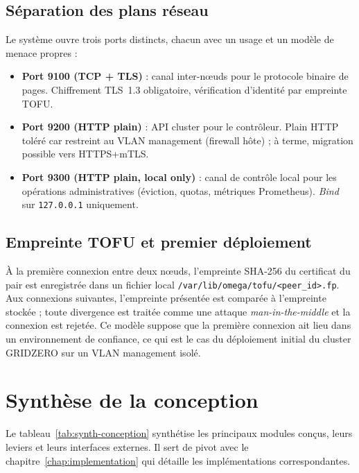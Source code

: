 \subsection{Séparation des plans réseau}

Le système ouvre trois ports distincts, chacun avec un usage et un modèle de menace propres :

\begin{itemize}[leftmargin=*]
    \item \textbf{Port 9100 (TCP + TLS)} : canal inter-nœuds pour le protocole binaire de pages. Chiffrement TLS~1.3 obligatoire, vérification d'identité par empreinte TOFU.
    \item \textbf{Port 9200 (HTTP plain)} : API cluster pour le contrôleur. Plain HTTP toléré car restreint au VLAN management (firewall hôte) ; à terme, migration possible vers HTTPS+mTLS.
    \item \textbf{Port 9300 (HTTP plain, local only)} : canal de contrôle local pour les opérations administratives (éviction, quotas, métriques Prometheus). \emph{Bind} sur \texttt{127.0.0.1} uniquement.
\end{itemize}

\subsection{Empreinte TOFU et premier déploiement}

À la première connexion entre deux nœuds, l'empreinte SHA-256 du certificat du pair est enregistrée dans un fichier local \texttt{/var/lib/omega/tofu/<peer\_id>.fp}. Aux connexions suivantes, l'empreinte présentée est comparée à l'empreinte stockée ; toute divergence est traitée comme une attaque \emph{man-in-the-middle} et la connexion est rejetée. Ce modèle suppose que la première connexion ait lieu dans un environnement de confiance, ce qui est le cas du déploiement initial du cluster GRIDZERO sur un VLAN management isolé.

\section{Synthèse de la conception}
\label{sec:synthese-conception}

Le tableau~\ref{tab:synth-conception} synthétise les principaux modules conçus, leurs leviers et leurs interfaces externes. Il sert de pivot avec le chapitre~\ref{chap:implementation} qui détaille les implémentations correspondantes.

